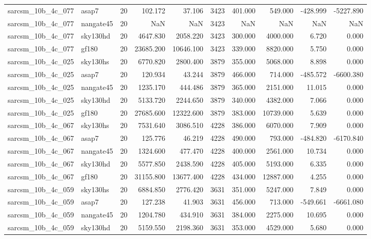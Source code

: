 \begin{longtable}{llrrrrrrrr}
sarcsm\_10b\_4c\_077 & asap7 & 20 & 102.172 & 37.106 & 3423 & 401.000 & 549.000 & -428.999 & -5227.890 \\
sarcsm\_10b\_4c\_077 & nangate45 & 20 & NaN & NaN & 3423 & NaN & NaN & NaN & NaN \\
sarcsm\_10b\_4c\_077 & sky130hd & 20 & 4647.830 & 2058.220 & 3423 & 300.000 & 4000.000 & 6.720 & 0.000 \\
sarcsm\_10b\_4c\_077 & gf180 & 20 & 23685.200 & 10646.100 & 3423 & 339.000 & 8820.000 & 5.750 & 0.000 \\
sarcsm\_10b\_4c\_025 & sky130hs & 20 & 6770.820 & 2800.400 & 3879 & 355.000 & 5068.000 & 8.898 & 0.000 \\
sarcsm\_10b\_4c\_025 & asap7 & 20 & 120.934 & 43.244 & 3879 & 466.000 & 714.000 & -485.572 & -6600.380 \\
sarcsm\_10b\_4c\_025 & nangate45 & 20 & 1235.170 & 444.486 & 3879 & 365.000 & 2151.000 & 11.015 & 0.000 \\
sarcsm\_10b\_4c\_025 & sky130hd & 20 & 5133.720 & 2244.650 & 3879 & 340.000 & 4382.000 & 7.066 & 0.000 \\
sarcsm\_10b\_4c\_025 & gf180 & 20 & 27685.600 & 12322.600 & 3879 & 383.000 & 10739.000 & 5.639 & 0.000 \\
sarcsm\_10b\_4c\_067 & sky130hs & 20 & 7531.640 & 3086.510 & 4228 & 386.000 & 6070.000 & 7.909 & 0.000 \\
sarcsm\_10b\_4c\_067 & asap7 & 20 & 125.776 & 46.219 & 4228 & 490.000 & 793.000 & -484.820 & -6170.840 \\
sarcsm\_10b\_4c\_067 & nangate45 & 20 & 1324.600 & 477.470 & 4228 & 400.000 & 2561.000 & 10.734 & 0.000 \\
sarcsm\_10b\_4c\_067 & sky130hd & 20 & 5577.850 & 2438.590 & 4228 & 405.000 & 5193.000 & 6.335 & 0.000 \\
sarcsm\_10b\_4c\_067 & gf180 & 20 & 31155.800 & 13677.400 & 4228 & 434.000 & 12887.000 & 4.255 & 0.000 \\
sarcsm\_10b\_4c\_059 & sky130hs & 20 & 6884.850 & 2776.420 & 3631 & 351.000 & 5247.000 & 7.849 & 0.000 \\
sarcsm\_10b\_4c\_059 & asap7 & 20 & 127.238 & 41.903 & 3631 & 456.000 & 713.000 & -549.661 & -6661.080 \\
sarcsm\_10b\_4c\_059 & nangate45 & 20 & 1204.780 & 434.910 & 3631 & 384.000 & 2275.000 & 10.695 & 0.000 \\
sarcsm\_10b\_4c\_059 & sky130hd & 20 & 5159.550 & 2198.360 & 3631 & 353.000 & 4529.000 & 5.680 & 0.000 \\

\end{longtable}
